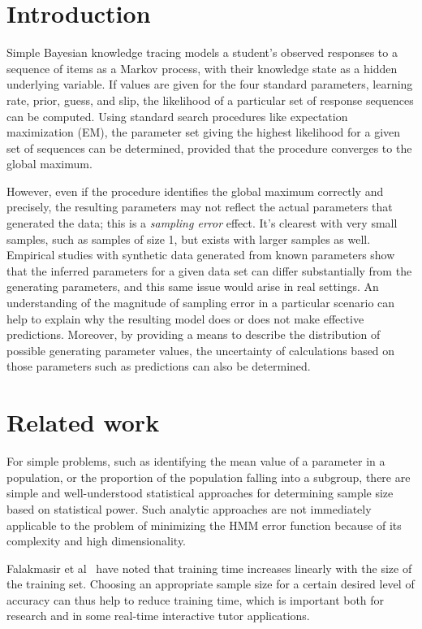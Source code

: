 \documentclass{edm_template}
\begin{document}
\section{Introduction}
Simple Bayesian knowledge tracing models a student's observed responses to a sequence of items
as a Markov process, with their knowledge state as a hidden underlying variable. If values
are given for the four standard parameters, learning rate, prior, guess, and slip, the
likelihood of a particular set of response sequences can be computed. Using standard search
procedures like expectation maximization (EM), the parameter set giving the highest likelihood
for a given set of sequences can be determined, provided that the procedure converges to the global
maximum.

However, even if the procedure identifies the global maximum correctly and precisely, the resulting
parameters may not reflect the actual parameters that generated the data; this is a \emph{sampling error}
effect. It's clearest with very small samples, such as samples of size 1, but exists with larger samples as well. Empirical studies with synthetic data generated from known parameters show that the inferred parameters for a given data set can differ substantially from the generating parameters, and this same issue would arise in real settings. An understanding of the magnitude of sampling error in a particular scenario
can help to explain why the resulting model does or does not make effective predictions. Moreover, by providing
a means to describe the distribution of possible generating parameter values, the uncertainty of calculations based on those parameters such as predictions can also be determined.

\section{Related work}
For simple problems, such as identifying the mean value of a parameter in a population, or the proportion of the population falling into a subgroup, there are simple and well-understood statistical approaches for determining sample size based on statistical power. Such analytic approaches are not immediately applicable to the problem of minimizing the HMM error function because of its complexity and high dimensionality.

Falakmasir et al~\cite{falakmasir2013spectral} have noted that training time increases linearly with the size of the training set. Choosing an appropriate sample size for a certain desired level of accuracy can thus help to reduce training time, which is important both for research and in some real-time interactive tutor applications.
\end{document}
